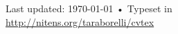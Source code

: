 \documentclass[10pt, a4paper]{article}
\begin{document}



\vfill{}

\begin{center}
{\scriptsize  Last updated: \today\- •\- 
Typeset in \href{http://nitens.org/taraborelli/cvtex}{\LuaLaTeX}\\
\href{http://nitens.org/taraborelli/cvtex}{http://nitens.org/taraborelli/cvtex}}
\end{center}
\end{document}
